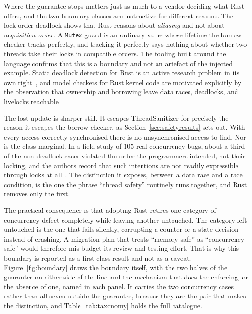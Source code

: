 \documentclass[english,oneside,a4paper,censored,csm,software-track-2020]{HYthesisML}
\begin{document}
Where the guarantee stops matters just as much to a vendor deciding what Rust offers, and the two
boundary classes are instructive for different reasons. The lock-order deadlock shows that Rust
reasons about \emph{aliasing} and not about \emph{acquisition order}. A \texttt{Mutex} guard is an
ordinary value whose lifetime the borrow checker tracks perfectly, and tracking it perfectly
says nothing about whether two threads take their locks in compatible orders. The tooling built
around the language confirms that this is a boundary and not an artefact of the injected example.
Static deadlock detection for Rust is an active research problem
in its own right~\cite{zhang2026deadlock}, and model checkers for Rust kernel code are motivated
explicitly by the observation that ownership and borrowing leave data races, deadlocks, and
livelocks reachable~\cite{tang2025converos}.

The lost update is sharper still. It escapes
ThreadSanitizer for precisely the reason it escapes the borrow checker, as
Section~\ref{sec:safetyresults} sets out. With every access correctly synchronised there is no
unsynchronised access to find. Nor is the class marginal. In a field study of $105$ real
concurrency bugs, about a third of the non-deadlock cases violated the order the programmers
intended, not their locking, and the authors record that such intentions are not readily
expressible through locks at all~\cite{lu2008mistakes}. The distinction
it exposes, between a data race and a race
condition, is the one the phrase ``thread safety'' routinely runs together, and Rust removes only
the first.

The practical consequence is that adopting Rust retires one category of concurrency defect
completely while leaving another untouched. The category left untouched is the one that fails
silently, corrupting a counter or a state decision instead of crashing. A migration plan that
treats ``memory-safe'' as ``concurrency-safe'' would therefore mis-budget its review and testing
effort. That is why this boundary is reported as a first-class result and not as a caveat.
Figure~\ref{fig:boundary} draws the boundary itself, with the two halves of the
guarantee on either side of the line and the mechanism that does the enforcing, or the absence
of one, named in each panel. It carries the two concurrency cases rather than all seven outside
the guarantee, because they are the pair that makes the distinction, and
Table~\ref{tab:taxonomy} holds the full catalogue.
\end{document}
